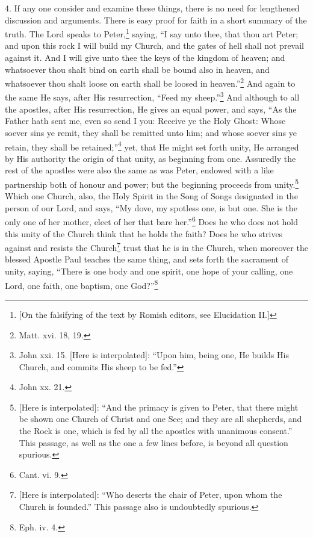 4. If any one consider and examine these things, there is no need for lengthened discussion and arguments. There is easy proof for faith in a short summary of the truth. The Lord speaks to Peter,\footnote{[On the falsifying of the text by Romish editors, see Elucidation II.]} saying, “I say unto thee, that thou art Peter; and upon this rock I will build my Church, and the gates of hell shall not prevail against it. And I will give unto thee the keys of the kingdom of heaven; and whatsoever thou shalt bind on earth shall be bound also in heaven, and whatsoever thou shalt loose on earth shall be loosed in heaven.”\footnote{Matt. xvi. 18, 19.} And again to the same He says, after His resurrection, “Feed my sheep.”\footnote{John xxi. 15. [Here is interpolated]: “Upon him, being one, He builds His Church, and commits His sheep to be fed.”} And although to all the apostles, after His resurrection, He gives an equal power, and says, “As the Father hath sent me, even so send I you: Receive ye the Holy Ghost: Whose soever sins ye remit, they shall be remitted unto him; and whose soever sins ye retain, they shall be retained;”\footnote{John xx. 21.} yet, that He might set forth unity, He arranged by His authority the origin of that unity, as beginning from one. Assuredly the rest of the apostles were also the same as was Peter, endowed with a like partnership both of honour and power; but the beginning proceeds from unity.\footnote{[Here is interpolated]: “And the primacy is given to Peter, that there might be shown one Church of Christ and one See; and they are all shepherds, and the Rock is one, which is fed by all the apostles with unanimous consent.” This passage, as well as the one a few lines before, is beyond all question spurious.} Which one Church, also, the Holy Spirit in the Song of Songs designated in the person of our Lord, and says, “My dove, my spotless one, is but one. She is the only one of her mother, elect of her that bare her.”\footnote{Cant. vi. 9.} Does he who does not hold this unity of the Church think that he holds the faith? Does he who strives against and resists the Church\footnote{[Here is interpolated]: “Who deserts the chair of Peter, upon whom the Church is founded.” This passage also is undoubtedly spurious.} trust that he is in the Church, when moreover the blessed Apostle Paul teaches the same thing, and sets forth the sacrament of unity, saying, “There is one body and one spirit, one hope of your calling, one Lord, one faith, one baptism, one God?”\footnote{Eph. iv. 4.}


